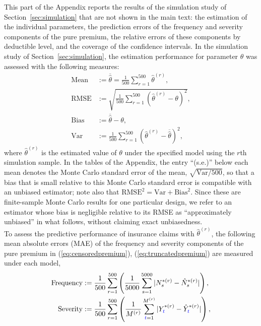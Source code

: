 \documentclass[11pt]{article}
\newcommand{\rev}[1]{{\color{blue}#1}}
\begin{document}
\rev{This part of the Appendix reports the results of the simulation study of Section~\ref{sec:simulation} that are not shown in the main text: the estimation of the individual parameters, the prediction errors of the frequency and severity components of the pure premium, the relative errors of these components by deductible level, and the coverage of the confidence intervals.}
\rev{In the simulation study of Section~\ref{sec:simulation},} the estimation performance for parameter $\theta$ was assessed with the following measures:
$$
\begin{aligned}
\text{Mean}&:= \overline{\hat{\theta}}=\frac{1}{500} \sum_{r=1}^{500} \hat{\theta}^{(r)}, \\
\text{RMSE}&:= \sqrt{\frac{1}{500} \sum_{r=1}^{500} (\hat{\theta}^{(r)} - \theta)^2}, \\
\text{Bias}&:= \overline{\hat{\theta}} - \theta, \\
\text{Var}&:= \frac{1}{500} \sum_{r=1}^{500} (\hat{\theta}^{(r)} - \overline{\hat{\theta}} )^2,
\end{aligned}
$$
where $\hat{\theta}^{(r)}$ is the estimated value of $\theta$ under the specified model using the $r${th} simulation sample. \rev{In the tables of the Appendix, the entry ``(s.e.)'' below each mean denotes the Monte Carlo standard error of the mean, $\sqrt{\text{Var}/500}$, so that a bias that is small relative to this Monte Carlo standard error is compatible with an unbiased estimator; note also that $\text{RMSE}^2=\text{Var}+\text{Bias}^2$. Since these are finite-sample Monte Carlo results for one particular design, we refer to an estimator whose bias is negligible relative to its RMSE as ``approximately unbiased'' in what follows, without claiming exact unbiasedness.} \\
To assess the predictive performance of insurance claims with $\hat{\theta}^{(r)}$, the following mean absolute errors (MAE) of \rev{the frequency and severity components of the pure premium in} (\ref{eq:censoredpremium}), (\ref{eq:truncatedpremium}) are measured under each model,
\begin{align*}
    \text{Frequency}&:=\frac{1}{500}\sum_{r=1}^{500}\left(\frac{1}{5000}\sum_{s=1}^{5000}|N^{*(r)}_s -\hat{N}^{*(r)}_s|\right),\nonumber\\
    \text{Severity}&:=
        \frac{1}{500}\sum_{r=1}^{500}\left(\frac{1}{M^{(r)}}\sum_{\rev{t}=1}^{M^{(r)}}|Y^{*(r)}_{\rev{t}} -\hat{Y}^{*(r)}_{\rev{t}}|\right),\nonumber
\end{align*}
\end{document}
